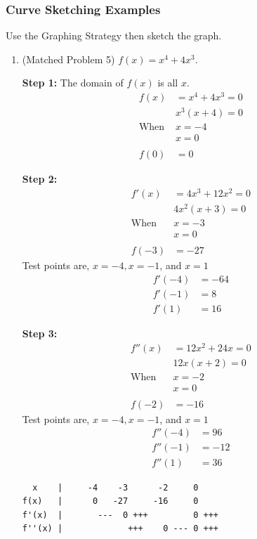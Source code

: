 \documentclass[14pt]{extarticle}
\begin{document}
\subsubsection{Curve Sketching Examples} Use the Graphing Strategy then sketch the graph.
\begin{enumerate}
	\item (Matched Problem 5)  $f(x)=x^4+4x^3$.
	
	\textbf{Step 1:} The domain of $f(x)$ is all $x$.
	\begin{align*}
		f(x) &=x^4+4x^3 =0 \\
		&x^3(x+4) = 0 \\
		\text{When } &x=-4\\
		&x=0 \\\\
		f(0) &=0
	\end{align*}

	\textbf{Step 2:}
	\begin{align*}
		f'(x) &=4x^3+12x^2 = 0 \\
		&4x^2(x+3)	=0 \\
		\text{When } &x=-3\\
		&x=0 \\\\
		f(-3) &= -27
	\end{align*}
	Test points are, $x=-4, x=-1$, and $x=1$
	\begin{align*}	
		f'(-4) &= -64 \\
		f'(-1) &=8 \\
		f'(1) &= 16
	\end{align*}

	\textbf{Step 3:}
	\begin{align*}
		f''(x) &= 12x^2 + 24x =0 \\
		&12x(x+2) = 0 \\
		\text{When } &x=-2\\
		&x=0 \\\\
		f(-2) &= -16
	\end{align*}
	Test points are, $x=-4, x=-1$, and $x=1$
	\begin{align*}	
		f''(-4) &= 96 \\
		f''(-1) &=-12 \\
		f''(1) &= 36
	\end{align*}
	
\begin{verbatim}
  x    |     -4    -3      -2     0    
f(x)   |      0   -27     -16     0  
f'(x)  |       ---  0 +++         0 +++
f''(x) |             +++    0 --- 0 +++
\end{verbatim}


\end{enumerate}
\end{document}
